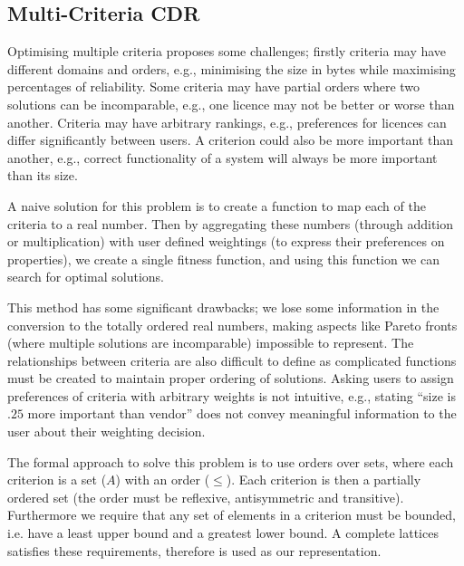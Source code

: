\subsection{Multi-Criteria CDR}
Optimising multiple criteria proposes some challenges; firstly criteria may have different domains and orders, 
e.g., minimising the size in bytes while maximising percentages of reliability. 
Some criteria may have partial orders where two solutions can be incomparable,
e.g., one licence may not be better or worse than another.
Criteria may have arbitrary rankings, 
e.g., preferences for licences can differ significantly between users.
A criterion could also be more important than another, 
e.g., correct functionality of a system will always be more important than its size.

A naive solution for this problem is to create a function to map each of the criteria to a real number.
Then by aggregating these numbers (through addition or multiplication) with user defined weightings 
(to express their preferences on properties), we create a single fitness function, 
and using this function we can search for optimal solutions.

This method has some significant drawbacks;
we lose some information in the conversion to the totally ordered real numbers,
making aspects like Pareto fronts \cite{pareto1964cours} (where multiple solutions are incomparable) impossible to represent.
The relationships between criteria are also difficult to define 
as complicated functions must be created to maintain proper ordering of solutions.
Asking users to assign preferences of criteria with arbitrary weights is not intuitive,
e.g., stating ``size is $.25$ more important than vendor'' does not convey meaningful information to the user about their weighting decision.

The formal approach to solve this problem is to use orders over sets, 
where each criterion is a set ($A$) with an order ($\leq$).
Each criterion is then a partially ordered set (the order must be reflexive, antisymmetric and transitive).
Furthermore we require that any set of elements in a criterion must be bounded, 
i.e. have a least upper bound and a greatest lower bound.
A complete lattices satisfies these requirements, therefore is used as our representation. 

